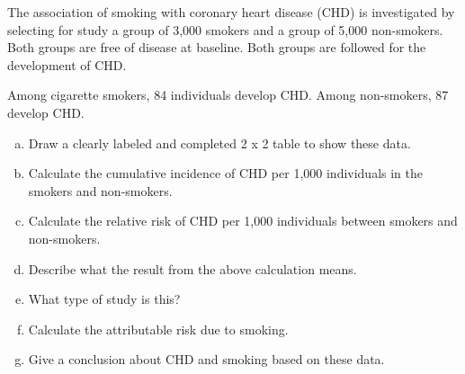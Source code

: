 
The association of smoking with coronary heart disease (CHD) is investigated by selecting for study a group of 3,000 smokers and a group of 5,000 non-smokers.  Both groups are free of disease at baseline.  Both groups are followed for the development of CHD.

Among cigarette smokers, 84 individuals develop CHD.  Among non-smokers, 87 develop CHD.

\begin{enumerate}[(a)]
\item	Draw a clearly labeled and completed 2 x 2 table to show these data. 

\answerSpace{2cm}

\item	Calculate the cumulative incidence of CHD per 1,000 individuals in the smokers and non-smokers.  

\answerSpace{2cm}

\item	Calculate the relative risk of CHD per 1,000 individuals between smokers and non-smokers.  

\answerSpace{2cm}

\item	Describe what the result from the above calculation means.  

\answerSpace{2cm}


\item	What type of study is this?  

\answerSpace{1cm}

\item	Calculate the attributable risk due to smoking.  
\answerSpace{2cm}


\item	Give a conclusion about CHD and smoking based on these data.
\answerSpace{1cm}

\end{enumerate}
